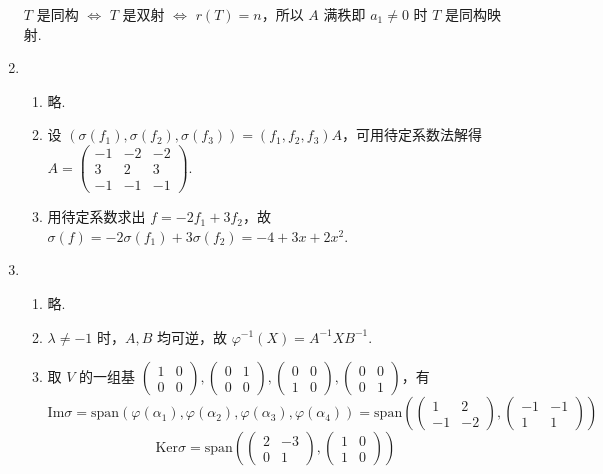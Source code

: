 \begin{enumerate}
    $T$ 是同构 $\Leftrightarrow$ $T$ 是双射 $\Leftrightarrow$ $r(T) = n$，所以 $A$ 满秩即 $a_1\neq 0$ 时 $T$ 是同构映射.
    \item \begin{enumerate}
        \item 略.
        \item 设 $(\sigma(f_1),\sigma(f_2),\sigma(f_3))=(f_1,f_2,f_3)A$，可用待定系数法解得 $A=\begin{pmatrix}-1 & -2 & -2 \\ 3 & 2 & 3 \\ -1 & -1 & -1\end{pmatrix}$.
        \item 用待定系数求出 $f=-2f_1+3f_2$，故 $\sigma(f)=-2\sigma(f_1)+3\sigma(f_2)=-4+3x+2x^2$.
    \end{enumerate}
    \item \begin{enumerate}
        \item 略.
        \item $\lambda \neq -1$ 时，$A,B$ 均可逆，故 $\varphi^{-1}(X)=A^{-1}XB^{-1}$.
        \item 取 $V$ 的一组基 $\begin{pmatrix}1 & 0 \\ 0 & 0\end{pmatrix},\begin{pmatrix}0 & 1 \\ 0 & 0\end{pmatrix},\begin{pmatrix}0 & 0 \\ 1 & 0\end{pmatrix},\begin{pmatrix}0 & 0 \\ 0 & 1\end{pmatrix}$，有
        \[\mathrm{Im}\sigma = \mathrm{span}(\varphi(\alpha_1),\varphi(\alpha_2),\varphi(\alpha_3),\varphi(\alpha_4))=\mathrm{span}(\begin{pmatrix}1 & 2 \\ -1 & -2\end{pmatrix},\begin{pmatrix}-1 & -1 \\ 1 & 1\end{pmatrix})\]
        \[\mathrm{Ker}\sigma = \mathrm{span}(\begin{pmatrix}2 & -3 \\ 0 & 1\end{pmatrix},\begin{pmatrix}1 & 0 \\ 1 & 0\end{pmatrix})\]

\end{enumerate}
\end{enumerate}
